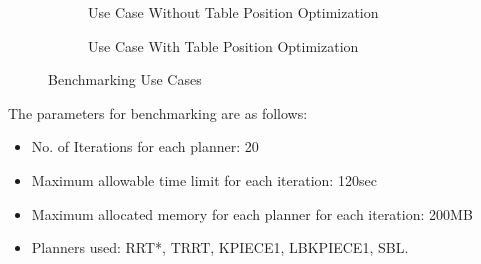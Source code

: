 \begin{figure}[!htbp] %
	\centering
	\begin{subfigure}[b]{0.4\textwidth}
		\caption{Use Case Without Table Position Optimization}  
		\label{bm:uc1}
	\end{subfigure}
	\begin{subfigure}[b]{0.4\textwidth}
		\caption{Use Case With Table Position Optimization}  
		\label{bm:uc2}
	\end{subfigure}	
	\caption{Benchmarking Use Cases}
	\label{bm:uc}
\end{figure}
\clearpage 
The parameters for benchmarking are as follows:
\begin{itemize}
	\item No. of Iterations for each planner: 20
	\item Maximum allowable time limit for each iteration: 120sec
	\item Maximum allocated memory for each planner for each iteration: 200MB
	\item Planners used: RRT*, TRRT, KPIECE1, LBKPIECE1, SBL.
\end{itemize}
